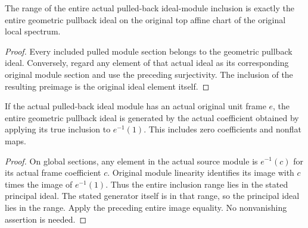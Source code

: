 \begin{corollary}
\label{cor:actual-local-spectrum-ideal-inclusion-image}
\leanok
{}
The range of the entire actual pulled-back ideal-module inclusion
is exactly the entire geometric pullback ideal on the original top
affine chart of the original local spectrum.
\end{corollary}
\begin{proof}
Every included pulled module section belongs to the geometric
pullback ideal. Conversely, regard any element of that actual ideal
as its corresponding original module section and use the preceding
surjectivity. The inclusion of the resulting preimage is the
original ideal element itself.
\end{proof}

\begin{corollary}
\label{cor:actual-local-spectrum-framed-ideal-principal}
\leanok
{}
If the actual pulled-back ideal module has an actual original unit
frame $e$, the entire geometric pullback ideal is generated by the
actual coefficient obtained by applying its true inclusion to
$e^{-1}(1)$. This includes zero coefficients and nonflat maps.
\end{corollary}
\begin{proof}
On global sections, any element in the actual source module is
$e^{-1}(c)$ for its actual frame coefficient $c$. Original module
linearity identifies its image with $c$ times the image of
$e^{-1}(1)$. Thus the entire inclusion range lies in the stated
principal ideal. The stated generator itself is in that range, so
the principal ideal lies in the range. Apply the preceding entire
image equality. No nonvanishing assertion is needed.
\end{proof}
